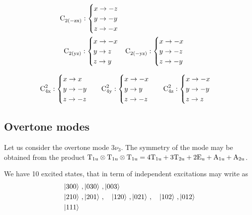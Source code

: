 \begin{minipage}[t]{0.45\linewidth}
\begin{align*}
  \ce{C_{2(-zx)}}:  \begin{cases} x \to -z\\ y \to -y\\ z \to -x \end{cases} \\
  \ce{C_{2(yz)}}:  \begin{cases} x \to -x\\ y \to z\\ z \to y \end{cases} &
  \ce{C_{2(-yz)}}:  \begin{cases} x \to -x\\ y \to -z\\ z \to -y \end{cases} 
\end{align*}
\end{minipage}
\begin{align*}
\ce{C^{2}_{4x}}:  \begin{cases} x \to x\\ y \to -y\\ z \to -z \end{cases} &&  
\ce{C^{2}_{4y}}:  \begin{cases} x \to -x\\ y \to y\\ z \to -z \end{cases} && 
\ce{C^{2}_{4z}}:  \begin{cases} x \to -x\\ y \to -y\\ z \to z \end{cases} 
\end{align*}
\subsection{Overtone modes}
\label{S:overtone-modes}


Let us consider the overtone mode $3 \nu_{3}$. The symmetry of the mode may be obtained from the product  $\text{T}_{\text{1u}} \otimes \text{T}_{\text{1u}} \otimes \text{T}_{\text{1u}} = 4 \text{T}_{\text{1u}} + 3 \text{T}_{\text{2u}} + 2 \text{E}_{\text{u}} + \text{A}_{\text{1u}} + \text{A}_{\text{2u}} $.

We have 10 excited states, that in term of independent excitations may write as
\begin{align*}
  &\left| 3 00 \right\rangle \,, \left| 030 \right\rangle \,, \left| 003 \right\rangle \\
  &\left| 210 \right\rangle \,, \left| 201 \right\rangle \,,\quad \left| 120 \right\rangle\,, \left| 021 \right\rangle\,, \quad \left| 102 \right\rangle\,, \left| 012 \right\rangle \\
  &\left| 111 \right\rangle
\end{align*}


